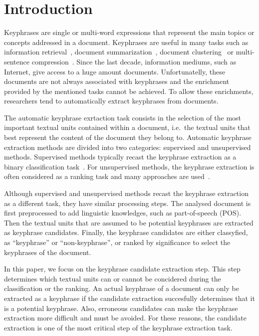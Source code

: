 \section{Introduction}
\label{sec:section}
  Keyphrases are single or multi-word expressions that represent the main topics
  or concepts addressed in a document. Keyphrases are useful in many tasks such
  as information retrieval~\cite{medelyan2008smalltrainingset}, document
  summarization~\cite{avanzo2005keyphrase}, document
  clustering~\cite{han2007webdocumentclustering} or multi-sentence
  compression~\cite{boudin2013multisentencecompression}.
  Since the last decade, information mediums, such as Internet, give access to a
  huge amount documents. Unfortunatelly, these documents are not always
  associated with keyphrases and the enrichment provided by the mentioned tasks
  cannot be achieved. To allow these enrichments, researchers tend to
  automatically extract keyphrases from documents.

  The automatic keyphrase exrtaction task consists in the selection of the most
  important textual units contained within a document, i.e.~the textual units
  that best represent the content of the document they belong to. Automatic
  keyphrase extraction methods are divided into two categories: supervised and
  unsupervised methods. Supervised methods typically recast the keyphrase
  extraction as a binary classification task~\cite{witten1999kea}. For
  unsupervised methods, the keyphrase extraction is often considered as a
  ranking task and many approaches are
  used~\cite{barker2000nounphrasehead,mihalcea2004textrank}.

  Although supervised and unsupervised methods recast the keyphrase extraction
  as a different task, they have similar processing steps. The analysed document
  is first preprocessed to add linguistic knowledges, such as part-of-speech
  (POS). Then the textual units that are assumed to be potential keyphrases are
  extracted as keyphrase candidates. Finally, the keyphrase candidates are
  either classyfied, as ``keyphrase'' or ``non-keyphrase'', or ranked by
  significance to select the keyphrases of the document.
  
  In this paper, we focus on the keyphrase candidate extraction step. This step
  determines which textual units can or cannot be concidered during the
  classification or the ranking. An actual keyphrase of a document can only be
  extracted as a keyphrase if the candidate extraction succesfully determines
  that it is a potential keyphrase. Also, erroneous candidates can make the
  keyphrase extraction more difficult and must be avoided. For these reasons,
  the candidate extraction is one of the most critical step of the keyphrase
  extraction task.

